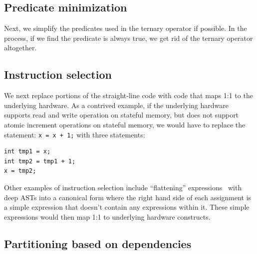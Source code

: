 \subsection{Predicate minimization}
Next, we simplify the predicates used in the ternary operator if possible.  In
the process, if we find the predicate is always true, we get rid of the ternary
operator altogether.

\subsection{Instruction selection}
We next replace portions of the straight-line code with code that maps 1:1 to
the underlying hardware. As a contrived example, if the underlying hardware
supports read and write operation on stateful memory, but does not support
atomic increment operations on stateful memory, we would have to replace the
statement: \texttt{x = x + 1;} with three statements:
\begin{verbatim}
int tmp1 = x;
int tmp2 = tmp1 + 1;
x = tmp2;
\end{verbatim}

Other examples of instruction selection include ``flattening''
expressions~\cite{expression_flattening} with deep ASTs into a canonical form
where the right hand side of each assignment is a simple expression that
doesn't contain any expressions within it. These simple expressions would then
map 1:1 to underlying hardware constructs.

\subsection{Partitioning based on dependencies}


